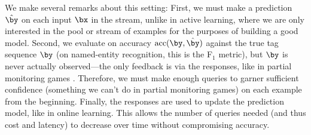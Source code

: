 We make several remarks about this setting:
First, we must make a prediction $\hat \by$ on each input $\bx$ in the stream,
unlike in active learning, where we are only interested in the pool or stream of examples
for the purposes of building a good model.
Second, we evaluate on accuracy $\text{acc}(\by, \hat\by)$ against the true tag sequence $\by$
(on named-entity recognition, this is the F$_1$ metric),
but $\by$ is never actually observed---the only feedback is via the responses,
like in partial monitoring games \citep{cesabianchi06regret}.
Therefore, we must make enough queries to garner sufficient confidence
(something we can't do in partial monitoring games)
on each example from the beginning.
Finally, the responses are used to update the prediction model, like in online learning.
This allows the number of queries needed (and thus cost and latency) to decrease over time
without compromising accuracy.






